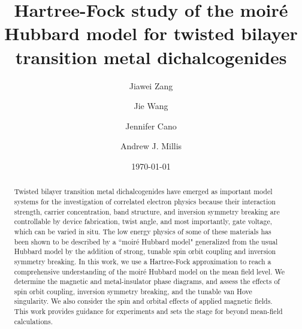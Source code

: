 \documentclass[%
reprint,
superscriptaddress,
twocolumn,
 amsmath,amssymb,
 aps,
 prb,
]{revtex4-2}
\begin{document}

\title{Hartree-Fock study of the moir\'e Hubbard model for twisted bilayer transition metal dichalcogenides}%
\author{Jiawei Zang}
\author{Jie Wang}
\author{Jennifer Cano}
\author{Andrew J. Millis}
\date{\today}%

\begin{abstract}
Twisted bilayer transition metal dichalcogenides have emerged as important model systems for the investigation of correlated electron physics because their interaction strength, carrier concentration, band structure, and inversion symmetry breaking are controllable by device fabrication, twist angle, and most importantly, gate voltage, which can be varied in situ. The low energy physics of some of these materials has been shown to be described by a ``moir\'e Hubbard model" generalized from the usual Hubbard model by the addition of strong, tunable spin orbit coupling and inversion symmetry breaking. In this work, we use a Hartree-Fock approximation to reach a comprehensive understanding of the moir\'e Hubbard model on the mean field level. We determine the magnetic and metal-insulator phase diagrams, and assess the effects of spin orbit coupling, inversion symmetry breaking, and the tunable van Hove singularity. We also consider the spin and orbital effects of applied magnetic fields. This work provides guidance for experiments and sets the stage for beyond mean-field calculations.
\end{abstract}
\end{document}
